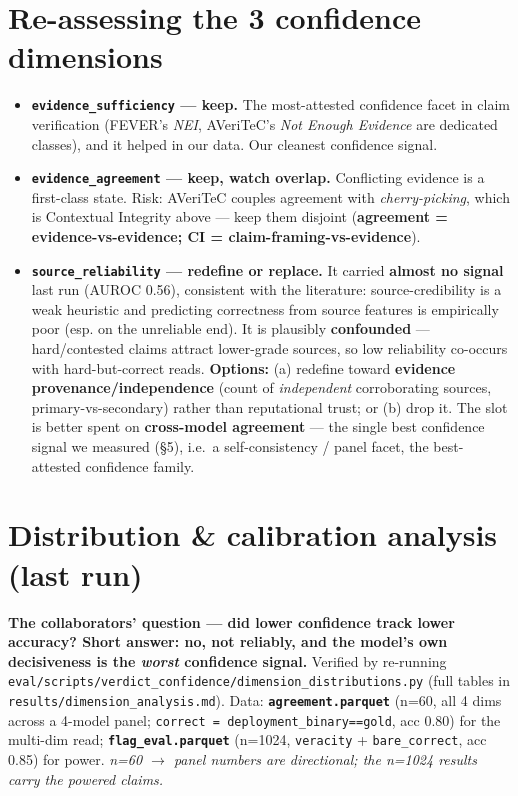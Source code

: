 \documentclass[11pt]{article}
\begin{document}
\section{Re-assessing the 3 confidence dimensions}

\begin{itemize}[leftmargin=1.4em]
  \item \textbf{\texttt{evidence\_sufficiency} --- keep.} The most-attested confidence facet
    in claim verification (FEVER's \emph{NEI}, AVeriTeC's \emph{Not Enough Evidence} are
    dedicated classes), and it helped in our data. Our cleanest confidence signal.
  \item \textbf{\texttt{evidence\_agreement} --- keep, watch overlap.} Conflicting evidence
    is a first-class state. Risk: AVeriTeC couples agreement with \emph{cherry-picking},
    which is Contextual Integrity above --- keep them disjoint (\textbf{agreement =
    evidence-vs-evidence; CI = claim-framing-vs-evidence}).
  \item \textbf{\texttt{source\_reliability} --- redefine or replace.} It carried
    \textbf{almost no signal} last run (AUROC 0.56), consistent with the literature:
    source-credibility is a weak heuristic and predicting correctness from source features is
    empirically poor (esp. on the unreliable end). It is plausibly \textbf{confounded} ---
    hard/contested claims attract lower-grade sources, so low reliability co-occurs with
    hard-but-correct reads. \textbf{Options:} (a) redefine toward \textbf{evidence
    provenance/independence} (count of \emph{independent} corroborating sources,
    primary-vs-secondary) rather than reputational trust; or (b) drop it. The slot is better
    spent on \textbf{cross-model agreement} --- the single best confidence signal we measured
    (\S5), i.e.\ a self-consistency / panel facet, the best-attested confidence family.
\end{itemize}

\hrulefill

\section{Distribution \& calibration analysis (last run)}

\textbf{The collaborators' question --- did lower confidence track lower accuracy? Short
answer: no, not reliably, and the model's own decisiveness is the \emph{worst} confidence
signal.} Verified by re-running
\texttt{eval/scripts/verdict\_confidence/dimension\_distributions.py} (full tables in
\texttt{results/dimension\_analysis.md}). Data: \textbf{\texttt{agreement.parquet}} (n=60,
all 4 dims across a 4-model panel; \texttt{correct = deployment\_binary==gold}, acc 0.80) for
the multi-dim read; \textbf{\texttt{flag\_eval.parquet}} (n=1024, \texttt{veracity} +
\texttt{bare\_correct}, acc 0.85) for power. \emph{n=60 $\rightarrow$ panel numbers are
directional; the n=1024 results carry the powered claims.}
\end{document}
